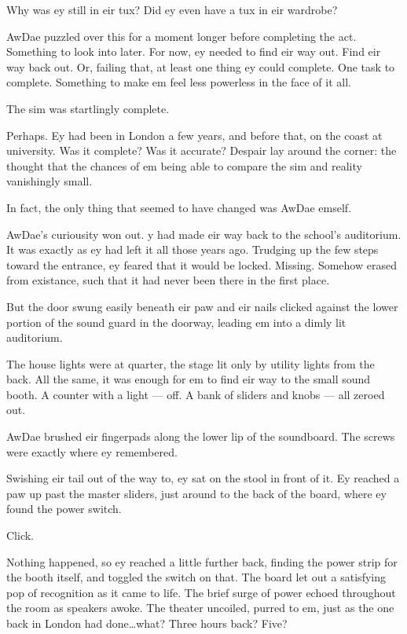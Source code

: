 Why was ey still in eir tux? Did ey even have a tux in eir wardrobe?

AwDae puzzled over this for a moment longer before completing the act. Something to look into later. For now, ey needed to find eir way out. Find eir way back out. Or, failing that, at least one thing ey could complete. One task to complete. Something to make em feel less powerless in the face of it all.

The sim was startlingly complete.

Perhaps. Ey had been in London a few years, and before that, on the coast at university. Was it complete? Was it accurate? Despair lay around the corner: the thought that the chances of em being able to compare the sim and reality vanishingly small.

In fact, the only thing that seemed to have changed was AwDae emself.

AwDae's curiousity won out. y had made eir way back to the school's auditorium. It was exactly as ey had left it all those years ago. Trudging up the few steps toward the entrance, ey feared that it would be locked. Missing. Somehow erased from existance, such that it had never been there in the first place.

But the door swung easily beneath eir paw and eir nails clicked against the lower portion of the sound guard in the doorway, leading em into a dimly lit auditorium.

The house lights were at quarter, the stage lit only by utility lights from the back. All the same, it was enough for em to find eir way to the small sound booth. A counter with a light --- off. A bank of sliders and knobs --- all zeroed out.

AwDae brushed eir fingerpads along the lower lip of the soundboard. The screws were exactly where ey remembered.

Swishing eir tail out of the way to, ey sat on the stool in front of it. Ey reached a paw up past the master sliders, just around to the back of the board, where ey found the power switch.

Click.

Nothing happened, so ey reached a little further back, finding the power strip for the booth itself, and toggled the switch on that. The board let out a satisfying pop of recognition as it came to life. The brief surge of power echoed throughout the room as speakers awoke. The theater uncoiled, purred to em, just as the one back in London had done\ldots{}what? Three hours back? Five?

